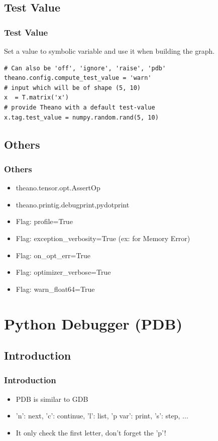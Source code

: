\documentclass[utf8x,xcolor=pdftex,dvipsnames,table]{beamer}
\begin{document}
\subsection{Test Value}
\begin{frame}[fragile]
  \frametitle{Test Value}
Set a value to symbolic variable and use it when building the graph.

 \vspace{1cm}

\begin{lstlisting}
# Can also be 'off', 'ignore', 'raise', 'pdb'
theano.config.compute_test_value = 'warn'
# input which will be of shape (5, 10)
x  = T.matrix('x')
# provide Theano with a default test-value
x.tag.test_value = numpy.random.rand(5, 10)
\end{lstlisting}

\end{frame}

\subsection{Others}
\begin{frame}
  \frametitle{Others}
  \begin{itemize}
  \item theano.tensor.opt.AssertOp
  \item theano.printig.{debugprint,pydotprint}


  \item Flag: profile=True
  \item Flag: exception\_verbosity=True (ex: for Memory Error)
  \item Flag: on\_opt\_err=True
  \item Flag: optimizer\_verbose=True
  \item Flag: warn\_float64=True
  \end{itemize}
\end{frame}

\section{Python Debugger (PDB)}
\subsection{Introduction}
\begin{frame}
  \frametitle{Introduction}
  \begin{itemize}
  \item PDB is similar to GDB
  \item 'n': next, 'c': continue, 'l': list, 'p var': print, 's': step, ...
  \item It only check the first letter, don't forget the 'p'!
  \end{itemize}
\end{frame}
\end{document}
